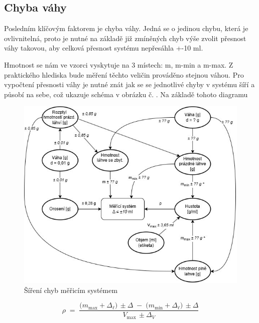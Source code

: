 \subsection{Chyba váhy}
Posledním klíčovým faktorem je chyba váhy. Jedná se o jedinou chybu, která je ovlivnitelná, proto je nutné na základě již zmíněných chyb výše zvolit přesnost váhy takovou, aby celková přesnost systému nepřesáhla +-10 ml. 


Hmotnost se nám ve vzorci vyskytuje na 3 místech: m, m-min a m-max. Z praktického hlediska bude měření těchto veličin prováděno stejnou váhou. Pro vypočtení přesnosti váhy je nutné znát jak se se jednotlivé chyby v systému šíří a působí na sebe, což ukazuje schéma v obrázku č. . Na základě tohoto diagramu

\begin{figure}[H]
    \begin{center}
        \includegraphics[scale=0.9]{obrazky/Propagace nejistot-Metoda1++.jpg}
    \end{center}
    \caption{Šíření chyb měřicím systémem}
\end{figure}

\[
\rho \;=\;
\frac{\bigl(m_{\max}+\Delta_{\ell}\bigr)\,\pm\Delta
      \;-\;\bigl(m_{\min}+\Delta_{\ell}\bigr)\,\pm\Delta}
     {V_{\max}\,\pm\Delta_V}
\]

